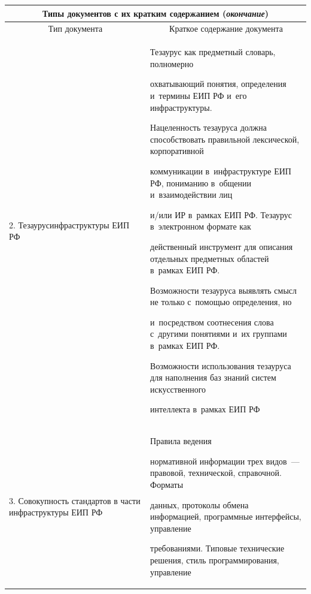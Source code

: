 \begin{table}\small

     \begin{center}

     \label{ppa}

      \begin{tabular}{|p{26mm}|p{95mm}|}

     \multicolumn{2}{c}{Типы документов с их кратким содержанием (\textit{окончание})}\\[6pt]

      \hline

\multicolumn{1}{|c|}{Тип документа}&\multicolumn{1}{c|}{Краткое содержание документа}\\

\hline

2. Тезаурус\newline инфраструктуры ЕИП РФ&

Тезаурус как предметный словарь, полномерно

охватывающий понятия, определения и~термины ЕИП РФ и~его инфраструктуры.

Нацеленность тезауруса должна способствовать правильной лексической, корпоративной

коммуникации в~инфраструктуре ЕИП РФ, пониманию в~общении и~взаимодействии лиц

и\!/\!или ИР в~рамках ЕИП РФ. Тезаурус в~электронном формате как

действенный инструмент для описания отдельных предметных областей в~рамках ЕИП РФ.

Возможности тезауруса выявлять смысл не только с~по\-мощью определения, но

и~посредством соотнесения слова с~другими понятиями и~их группами в~рамках ЕИП РФ.

Возможности использования тезауруса для наполнения баз знаний систем искусственного

интеллекта в~рамках ЕИП РФ\\

\hline

3. Совокупность стандартов в час\-ти инфраструктуры ЕИП РФ&Правила ведения

нормативной информации трех видов~--- правовой, технической, справочной. Форматы

данных, протоколы обмена информацией, программные интерфейсы, управление

требованиями. Типовые технические решения, стиль программирования, управление


\end{tabular}
\end{center}
\end{table}

